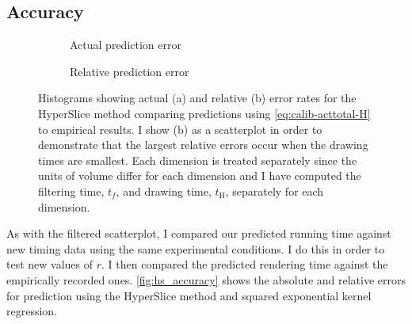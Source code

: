 \begin{table}[h]
\centering
\caption[Rendering time calibration results]{%
  Table showing the calibrated parameters, $a$, $t_f$, and $t_\text{H}$,
  as a result of running a segmented regression fit using the data I gathered
  from my timing experiments and \autoref{eq:expanded-regression}.
  The factors $t_f$ and $t_\text{H}$ are in nanoseconds and $a$ is defined
  in terms of fragments per sample.
}

\label{tbl:model_fits}
\end{table}

\subsection{Accuracy}
 
\begin{figure}[t]
  \centering
  \begin{subfigure}{0.50\linewidth}
    \resizebox{\linewidth}{!}{%
      {\tiny }}
    \caption{Actual prediction error}
    \label{fig:hs_abs_error}
  \end{subfigure}%
  \begin{subfigure}{0.50\linewidth}
    \resizebox{\linewidth}{!}{%
      {\tiny }}
    \caption{Relative prediction error}
    \label{fig:hs_rel_error}
  \end{subfigure}
  \caption[Actual and relative error rates of prediction]{%
    Histograms showing actual (a) and relative (b) error rates
    for the HyperSlice method
    comparing predictions using \autoref{eq:calib-acttotal-H} to empirical 
    results.  I show (b) as a scatterplot in order to demonstrate that
    the largest relative errors occur when the drawing times are 
    smallest.
    Each dimension is treated separately since the units of volume differ
    for each dimension and I have computed the filtering time, $t_f$,
    and drawing time, $t_\text{H}$, separately for each dimension.
  }
  \label{fig:hs_accuracy}
\end{figure}

As with the filtered scatterplot, I compared our predicted running time
against new timing data using the same experimental conditions.  I do this
in order to test new values of $r$.  I then compared the predicted 
rendering time against the empirically recorded ones. 
\autoref{fig:hs_accuracy} shows the absolute and relative
errors for prediction using the HyperSlice method and squared exponential 
kernel regression.

